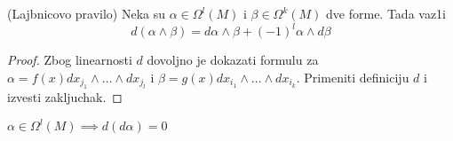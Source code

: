\documentclass[a4paper,12pt]{article}
\begin{document}
\begin{tvr} (Lajbnicovo pravilo)
Neka su $\alpha \in \Omega^l(M)$ i $\beta \in \Omega^k(M)$ dve forme. Tada vaz1i 
\[d(\alpha \wedge \beta) = d \alpha \wedge \beta + (-1)^l \alpha \wedge d \beta \]
\end{tvr}
\begin{proof}
Zbog linearnosti $d$ dovoljno je dokazati formulu za $\alpha = f(x) dx_{j_1} \wedge \dots \wedge dx_{j_l}$ i $\beta = g(x) dx_{i_1} \wedge \dots \wedge dx_{i_k}$. Primeniti definiciju $d$ i izvesti zakljuchak.
\end{proof}

\begin{tma} 
$\alpha \in \Omega^l(M) \implies d(d \alpha) = 0$
\end{tma}
\end{document}
